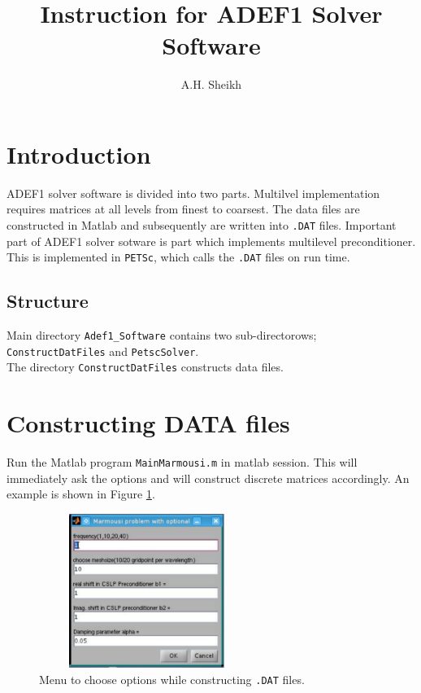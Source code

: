 \documentclass[a4paper,11pt]{article}
\author{A.H. Sheikh}
\title{Instruction for ADEF1 Solver Software}
\date{}
\begin{document}
%
\maketitle
%
\section{Introduction}
ADEF1 solver software is divided into two parts. Multilvel implementation
requires matrices at all levels from finest to coarsest. The data files are
constructed in Matlab and subsequently are written into \texttt{.DAT} files.
Important part of ADEF1 solver sotware is part which implements multilevel
preconditioner. This is implemented in \texttt{PETSc}, which calls the 
\texttt{.DAT} files on run time. 
\subsection{Structure}
Main directory  \texttt{Adef1\_Software} contains two sub-directorows;
\texttt{ConstructDatFiles} and \texttt{PetscSolver}.\\
The directory \texttt{ConstructDatFiles} constructs data files. 
\section{Constructing DATA files}
Run the Matlab program \texttt{MainMarmousi.m} in matlab session. This will
immediately ask the options and will construct discrete matrices accordingly.
An example is shown in Figure \ref{fig:fig1}.
%
\begin{figure}[h]
\centering
\includegraphics[width=7cm,height=5cm]{image1.pdf}
\caption{Menu to choose options while constructing \texttt{.DAT} files.}
\label{fig:fig1}
\end{figure}
\\



% 
% 
% 
% 
% 
% 
% 
% 
% 
% 
%  
%   
%    

%
\end{document}
